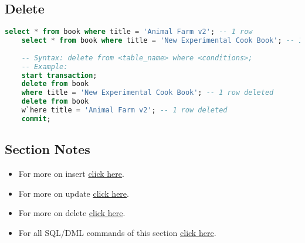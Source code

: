 \subsection{Delete}
\begin{lstlisting}[language=SQL]
	select * from book where title = 'Animal Farm v2'; -- 1 row
	select * from book where title = 'New Experimental Cook Book'; -- 1 row
	
	-- Syntax: delete from <table_name> where <conditions>;
	-- Example:
	start transaction;
	delete from book
	where title = 'New Experimental Cook Book'; -- 1 row deleted
	delete from book
	w`here title = 'Animal Farm v2'; -- 1 row deleted
	commit;
\end{lstlisting}
\subsection{Section Notes}
\begin{itemize}
	\item For more on insert \href{https://dev.mysql.com/doc/refman/8.0/en/insert.html}{click here}.
	\item For more on update \href{https://dev.mysql.com/doc/refman/8.0/en/update.html}{click here}.
	\item For more on delete \href{https://dev.mysql.com/doc/refman/8.0/en/delete.html}{click here}.
	\item For all \acs{SQL}/\acs{DML} commands of this section \href{file:./source-items/sql/3-sql-dml.sql}{click here}.
\end{itemize}
